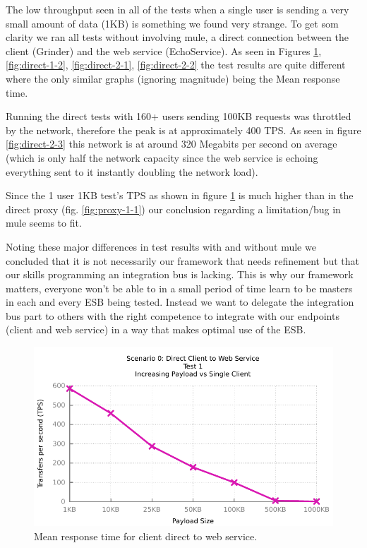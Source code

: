 The low throughput seen in all of the tests when a single user is sending a very small amount of data (1KB) is something we found very strange. 
To get som clarity we ran all tests without involving mule, a direct connection between the client (Grinder) and the web service (EchoService). As seen in Figures \ref{fig:direct-1-1}, \ref{fig:direct-1-2}, \ref{fig:direct-2-1}, \ref{fig:direct-2-2} the test results are quite different where the only similar graphs (ignoring magnitude) being the Mean response time.

Running the direct tests with 160+ users sending 100KB requests was throttled by the network, therefore the peak is at approximately 400 TPS. As seen in figure \ref{fig:direct-2-3} this network is at around 320 Megabits per second on average (which is only half the network capacity since the web service is echoing everything sent to it instantly doubling the network load).

Since the 1 user 1KB test's TPS as shown in figure \ref{fig:direct-1-1} is much higher than in the direct proxy (fig. \ref{fig:proxy-1-1}) our conclusion regarding a limitation/bug in mule seems to fit.

Noting these major differences in test results with and without mule we concluded that it is not necessarily our framework that needs refinement but that our skills programming an integration bus is lacking. This is why our framework matters, everyone won't be able to in a small period of time learn to be masters in each and every ESB being tested. Instead we want to delegate the integration bus part to others with the right competence to integrate with our endpoints (client and web service) in a way that makes optimal use of the ESB.

\begin{figure}[H]
	\caption{Mean response time for client direct to web service.}
	\centerline{\includegraphics{img/direct_fu_ip_tps}}
	\label{fig:direct-1-1}
\end{figure}

